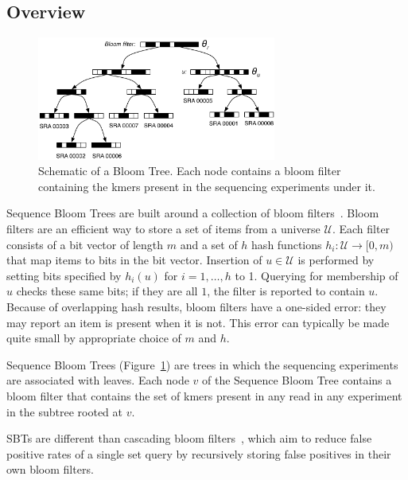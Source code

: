 \documentclass[11pt]{article}
\begin{document}
\subsection{Overview}
\begin{figure}
\centering
\includegraphics[width=0.7\textwidth]{BloomTreeSchematic}
\caption{Schematic of a Bloom Tree. Each node contains a bloom filter containing the kmers present in the sequencing experiments under it.}\label{fig:schematic}
\end{figure}

Sequence Bloom Trees are built around a collection of bloom filters~\cite{bloom,mitzenmacher}. Bloom filters are an efficient way to store a set of items from a universe $\mathcal{U}$. Each filter consists of a bit vector of length $m$ and a set of $h$ hash functions $h_i : \mathcal{U} \rightarrow [0,m)$ that map items to bits in the bit vector. Insertion of $u \in \mathcal{U}$ is performed by setting bits specified by $h_i(u)$ for $i = 1,\dots,h$ to 1. Querying for membership of $u$ checks these same bits; if they are all $1$, the filter is reported to contain $u$. Because of overlapping hash results, bloom filters have a one-sided error: they may report an item is present when it is not. This error can typically be made quite small by appropriate choice of $m$ and $h$. 

Sequence Bloom Trees (Figure~\ref{fig:schematic}) are trees in which the sequencing experiments are associated with leaves. Each node $v$ of the Sequence Bloom Tree contains a bloom filter that contains the set of kmers present in any read in any experiment in the subtree rooted at $v$. 

SBTs are different than cascading bloom filters~\cite{cascading}, which aim to reduce false positive rates of a single set query by recursively storing false positives in their own bloom filters.
\end{document}
